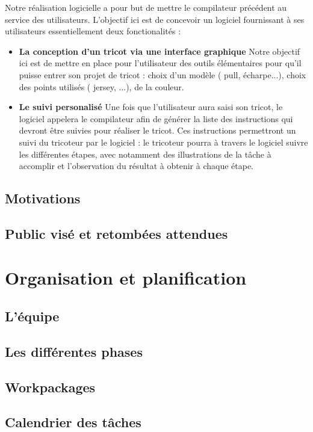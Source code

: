 \documentclass{article}
\begin{document}
Notre réalisation logicielle a pour but de mettre le compilateur précédent au service des utilisateurs. 
L'objectif ici est de concevoir un logiciel fournissant à ses utilisateurs essentiellement deux fonctionalités :
\begin{itemize} 
  \item \textbf{La conception d'un tricot via une interface graphique} Notre objectif ici est de mettre en place pour l'utilisateur des
  outils élémentaires pour qu'il puisse entrer son projet de tricot : choix d'un modèle ( pull, écharpe...), choix des points utilisés 
  ( jersey, ...), de la couleur.
  \item \textbf{Le suivi personalisé} Une fois que l'utilisateur aura saisi son tricot, le logiciel appelera le compilateur afin de générer 
la liste des instructions qui devront être suivies pour réaliser le tricot. Ces instructions permettront un suivi du tricoteur par le 
logiciel : le tricoteur pourra à travers le logiciel suivre les différentes étapes, avec notamment des illustrations de la tâche à 
accomplir et l'observation du résultat à obtenir à chaque étape.
\end{itemize}

\subsection{Motivations}

\subsection{Public visé et retombées attendues}

\section{Organisation et planification}

\subsection{L'équipe}

\subsection{Les différentes phases}

\subsection{Workpackages}

\subsection{Calendrier des tâches}
\end{document}
